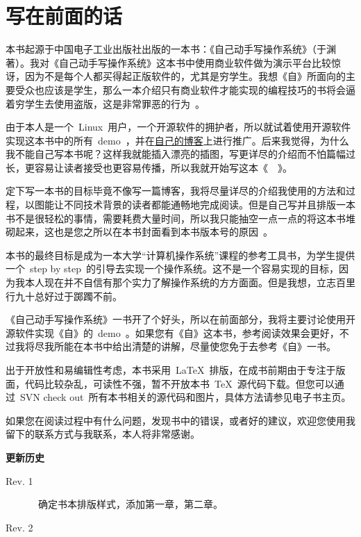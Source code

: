 \chapter{写在前面的话} \label{fore}


\begin{kaitext}

本书起源于中国电子工业出版社出版的一本书：《自己动手写操作系统》（于渊著）。我对《自己动手写操作系统》这本书中使用商业软件做为演示平台比较惊讶，因为不是每个人都买得起正版软件的，尤其是穷学生。我想《自》所面向的主要受众也应该是学生，那么一本介绍只有商业软件才能实现的编程技巧的书将会逼着穷学生去使用盗版，这是非常罪恶的行为~\frownie。

由于本人是一个~Linux~用户，一个开源软件的拥护者，所以就试着使用开源软件实现这本书中的所有~demo~，并在\href{http://blog.solrex.cn}{自己的博客}上进行推广。后来我觉得，为什么我不能自己写本书呢？这样我就能插入漂亮的插图，写更详尽的介绍而不怕篇幅过长，更容易让读者接受也更容易传播，所以我就开始写这本《~\BookName~》。

定下写一本书的目标毕竟不像写一篇博客，我将尽量详尽的介绍我使用的方法和过程，以图能让不同技术背景的读者都能通畅地完成阅读。但是自己写并且排版一本书不是很轻松的事情，需要耗费大量时间，所以我只能抽空一点一点的将这本书堆砌起来，这也是您之所以在本书封面看到本书版本号的原因~\smiley。

本书的最终目标是成为一本大学“计算机操作系统”课程的参考工具书，为学生提供一个~step by step~的引导去实现一个操作系统。这不是一个容易实现的目标，因为我本人现在并不自信有那个实力了解操作系统的方方面面。但是我想，立志百里行九十总好过于踯躅不前。

《自己动手写操作系统》一书开了个好头，所以在前面部分，我将主要讨论使用开源软件实现《自》的~demo~。如果您有《自》这本书，参考阅读效果会更好，不过我将尽我所能在本书中给出清楚的讲解，尽量使您免于去参考《自》一书。

出于开放性和易编辑性考虑，本书采用~\LaTeX~排版，在成书前期由于专注于版面，代码比较杂乱，可读性不强，暂不开放本书~\TeX~源代码下载。但您可以通过~SVN check out~所有本书相关的源代码和图片，具体方法请参见电子书主页。

如果您在阅读过程中有什么问题，发现书中的错误，或者好的建议，欢迎您使用我留下的联系方式与我联系，本人将非常感谢。
\vskip 1cm
\noindent
{}
\end{kaitext}

\begin{lined}{\textwidth}
\textbf{更新历史}
\small
\begin{description}
    \item[Rev. 1]~确定书本排版样式，添加第一章，第二章。
    \item[Rev. 2]~
\end{description}
\vspace{2ex}
\end{lined}

